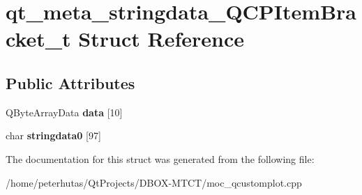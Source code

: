 \hypertarget{structqt__meta__stringdata___q_c_p_item_bracket__t}{}\section{qt\+\_\+meta\+\_\+stringdata\+\_\+\+Q\+C\+P\+Item\+Bracket\+\_\+t Struct Reference}
\label{structqt__meta__stringdata___q_c_p_item_bracket__t}
\subsection*{Public Attributes}
\begin{DoxyCompactItemize}
\item 
\mbox{\label{structqt__meta__stringdata___q_c_p_item_bracket__t_a43e94e3d311baab0f40ef38c9a1869b9}} 
Q\+Byte\+Array\+Data {\bfseries data} \mbox{[}10\mbox{]}
\item 
\mbox{\label{structqt__meta__stringdata___q_c_p_item_bracket__t_a69c4efac85336d82d66b351f29e79864}} 
char {\bfseries stringdata0} \mbox{[}97\mbox{]}
\end{DoxyCompactItemize}


The documentation for this struct was generated from the following file\+:\begin{DoxyCompactItemize}
\item 
/home/peterhutas/\+Qt\+Projects/\+D\+B\+O\+X-\/\+M\+T\+C\+T/moc\+\_\+qcustomplot.\+cpp\end{DoxyCompactItemize}
